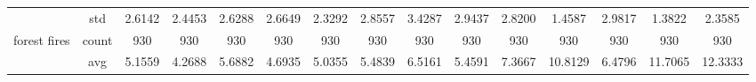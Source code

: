 \begin{table}[htbp]
{\begin{tabular}{rcccc|c|c|c|c|c|ccccc}
			                                                                               & std                                    & 2.6142                                                                             & 2.4453                                                                    & 2.6288                                                                    & 2.6649                                         & 2.3292                                                                    & 2.8557                                       & 3.4287                                      & 2.9437                                         & 2.8200                                         & 1.4587                                          & 2.9817                                          & 1.3822                                         & 2.3585                                         \\
			forest fires                                                                   & count                                  & 930                                                                                & 930                                                                       & 930                                                                       & 930                                            & 930                                                                       & 930                                          & 930                                         & 930                                            & 930                                            & 930                                             & 930                                             & 930                                            & 930                                            \\
			                                                                               & avg                                    & 5.1559                                                                             & \cellcolor[rgb]{ .776,  .937,  .808}\textcolor[rgb]{ 0,  .38,  0}{4.2688} & 5.6882                                                                    & 4.6935                                         & 5.0355                                                                    & 5.4839                                       & 6.5161                                      & 5.4591                                         & 7.3667                                         & 10.8129                                         & 6.4796                                          & 11.7065                                        & 12.3333                                        \\

\end{tabular}}
\end{table}
